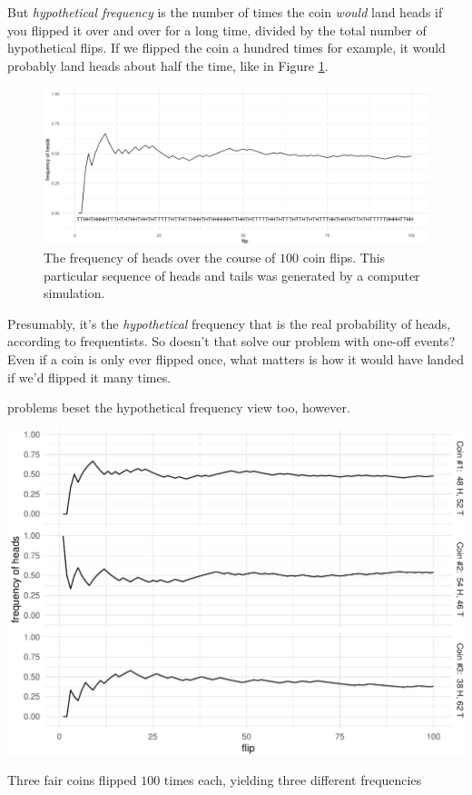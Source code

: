 \documentclass[justified]{tufte-book}
\theoremstyle{definition}
\theoremstyle{definition}
\theoremstyle{definition}
\theoremstyle{definition}
\theoremstyle{remark}
\begin{document}
But \emph{hypothetical frequency} is the number of times the coin \emph{would} land heads if you flipped it over and over for a long time, divided by the total number of hypothetical flips. If we flipped the coin a hundred times for example, it would probably land heads about half the time, like in Figure \ref{fig:hundredflips}.

\begin{figure}
\includegraphics{_main_files/figure-latex/hundredflips-1} \caption[The frequency of heads over the course of $100$ coin flips]{The frequency of heads over the course of $100$ coin flips. This particular sequence of heads and tails was generated by a computer simulation.}\label{fig:hundredflips}
\end{figure}

Presumably, it's the \emph{hypothetical} frequency that is the real probability of heads, according to frequentists. So doesn't that solve our problem with one-off events? Even if a coin is only ever flipped once, what matters is how it would have landed if we'd flipped it many times.

 problems beset the hypothetical frequency view too, however.

\begin{marginfigure}
\includegraphics{_main_files/figure-latex/threecoins-1} \caption[Three fair coins flipped $100$ times each, yielding three different frequencies]{Three fair coins flipped $100$ times each, yielding three different frequencies}\label{fig:threecoins}
\end{marginfigure}
\end{document}

